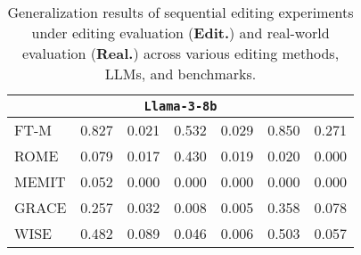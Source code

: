 \begin{table}[t]
\begin{adjustbox}{max width=\linewidth}
\begin{tabular}{lcc cc cc}
    \multicolumn{7}{c}{\texttt{\textbf{Llama-3-8b}}} \\
    \midrule
    FT-M & \num{0.827} & \num{0.021} & \num{0.532} & \num{0.029} & \num{0.850}   & \num{0.271} \\
    ROME & \num{0.079} & \num{0.017} & \num{0.430} & \num{0.019} & \num{0.020}   & \num{0.000} \\
    MEMIT & \num{0.052} & \num{0.000} & \num{0.000} & \num{0.000} & \num{0.000}   & \num{0.000} \\
    GRACE & \num{0.257} & \num{0.032} & \num{0.008} & \num{0.005} & \num{0.358}   & \num{0.078} \\
    WISE & \num{0.482} & \num{0.089} & \num{0.046} & \num{0.006} & \num{0.503}   & \num{0.057} \\
        \bottomrule 
    \end{tabular}
    \end{adjustbox}
    \caption{Generalization results of sequential editing experiments under editing evaluation (\textbf{Edit.}) and real-world evaluation (\textbf{Real.}) across various editing methods, LLMs, and benchmarks.} 
    \label{tab:seq_gen}
\end{table}
